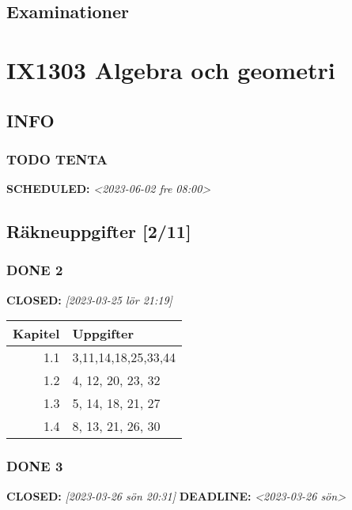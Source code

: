 \documentclass[11pt]{article}
\begin{document}
\subsection{Examinationer}
\label{sec:org8bf60e2}

\section{IX1303 Algebra och geometri}
\label{sec:orgfbd3990}

\subsection{INFO}
\label{sec:org19472ca}

\subsubsection{{\bfseries\sffamily TODO} TENTA}
\label{sec:org03c2e19}
\noindent\textbf{SCHEDULED:} \textit{<2023-06-02 fre 08:00>}\\[0pt]

\subsection{Räkneuppgifter [2/11]}
\label{sec:orgad0cef5}
\subsubsection{{\bfseries\sffamily DONE} 2}
\label{sec:org2b168b7}
\noindent\textbf{CLOSED:} \textit{[2023-03-25 lör 21:19]}\\[0pt]
\begin{center}
\begin{tabular}{rl}
Kapitel & Uppgifter\\[0pt]
\hline
1.1 & 3,11,14,18,25,33,44\\[0pt]
1.2 & 4, 12, 20, 23, 32\\[0pt]
1.3 & 5, 14, 18, 21, 27\\[0pt]
1.4 & 8, 13, 21, 26, 30\\[0pt]
\end{tabular}
\end{center}

\subsubsection{{\bfseries\sffamily DONE} 3}
\label{sec:orga239cc5}
\noindent\textbf{CLOSED:} \textit{[2023-03-26 sön 20:31] } \textbf{DEADLINE:} \textit{<2023-03-26 sön>}\\[0pt]
\end{document}
